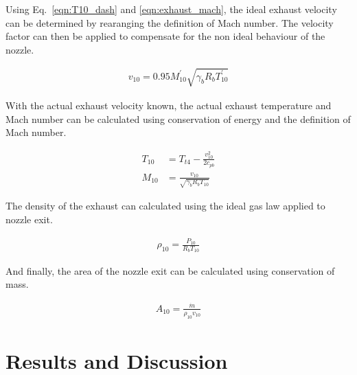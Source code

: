 \documentclass[a4paper]{article}
\begin{document}
Using Eq.~\ref{eqn:T10_dash} and \ref{eqn:exhaust_mach}, the ideal exhaust velocity can be determined by rearanging the definition of Mach number. The velocity factor can then be applied to compensate for the non ideal behaviour of the nozzle.

\begin{align}\label{eqn:v10_dash}
    v_{10} = 0.95 M_{10}^\prime \sqrt{\gamma_b R_b T_{10}^\prime}
\end{align}

With the actual exhaust velocity known, the actual exhaust temperature and Mach number can be calculated using conservation of energy and the definition of Mach number.

\begin{align}
    T_{10} &= T_{t4} - \frac{v_{10}^2}{2c_{pb}} \label{eqn:T10} \\
    M_{10} &= \frac{v_{10}}{\sqrt{\gamma_b R_b T_{10}}} \label{eqn:M10}
\end{align}

The density of the exhaust can calculated using the ideal gas law applied to nozzle exit.

\begin{align}
    \rho_{10} = \frac{P_{10}}{R_b  T_{10}}
\end{align}

And finally, the area of the nozzle exit can be calculated using conservation of mass.

\begin{align}
    A_{10} = \frac{\dot{m}}{\rho_{10}v_{10}}
\end{align}



\section{Results and Discussion}
\end{document}
